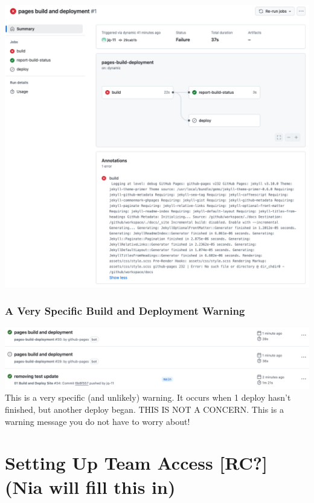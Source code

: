 \documentclass[
]{book}
\theoremstyle{definition}
\theoremstyle{definition}
\theoremstyle{definition}
\theoremstyle{definition}
\theoremstyle{remark}
\begin{document}
\includegraphics{img/git-instruct/failed-deploy.png}\\

\subsubsection*{A Very Specific Build and Deployment Warning}\label{a-very-specific-build-and-deployment-warning}

\includegraphics{img/git-instruct/exclamation-point-deploy-warning.png}\\

This is a very specific (and unlikely) warning. It occurs when 1 deploy hasn't finished, but another deploy began. THIS IS NOT A CONCERN. This is a warning message you do not have to worry about!

\section{Setting Up Team Access {[}RC?{]} (Nia will fill this in)}\label{setting-up-team-access-rc-nia-will-fill-this-in}
\end{document}
